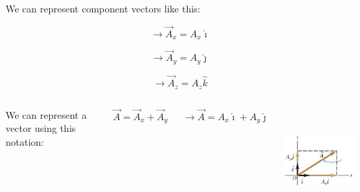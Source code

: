 \documentclass[]{beamer}
\begin{document}
\begin{frame}

We can represent component vectors like this:
\vspace{3mm}

\begin{equation*}
\rightarrow \vec{A}_x=A_x\hat{\imath}
\end{equation*}

\begin{equation*}
\rightarrow \vec{A}_y=A_y\hat{\jmath}
\end{equation*}


\begin{equation*}
\rightarrow \vec{A}_z=A_z\hat{k}
\end{equation*}

 \end{frame}

\begin{frame}




   \begin{columns}[c]
   \column{2in}  %

We can represent a vector using this notation:
\vspace{3mm}

\begin{equation*}
\vec{A}=\vec{A}_x+\vec{A}_y
\end{equation*}



\begin{equation*}
\rightarrow \vec{A}=A_x\hat{\imath}+A_y\hat{\jmath}
\end{equation*}



  
   \column{2in}




  \begin{center}
  \includegraphics[height=1.6in]{images/unit_vec_2.jpg}
\end{center}


   \end{columns}



 \end{frame}
\end{document}

